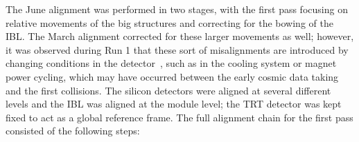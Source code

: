 The June alignment was performed in two stages, with the first pass focusing on relative movements of the big structures and correcting for the bowing of the IBL.
The March alignment corrected for these larger movements as well; however, it was observed during Run 1 that these sort of misalignments are introduced by changing conditions in the detector~\cite{2014.alignment-performance-8tev}, such as in the cooling system or magnet power cycling, which may have occurred between the early cosmic data taking and the first  collisions.
The silicon detectors were aligned at several different levels and the IBL was aligned at the module level; the TRT detector was kept fixed to act as a global reference frame.
The full alignment chain for the first pass consisted of the following steps:
